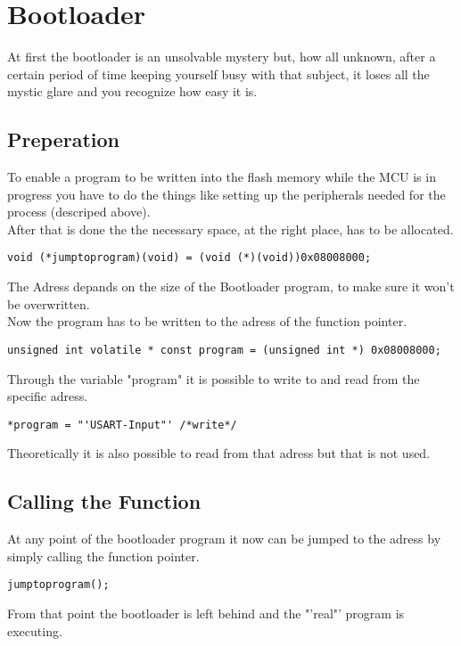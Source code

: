 \chapter{Bootloader}
At first the bootloader is an unsolvable mystery but, how all unknown, after a
certain period of time keeping yourself busy with that subject, it loses all the
mystic glare and you recognize how easy it is.\\

\section{Preperation}
To enable a program to be written into the flash memory while the MCU is in
progress you have to do the things like setting up the peripherals needed for 
the process (descriped above).\\
After that is done the the necessary space, at the right place, has to be
allocated.

\begin{lstlisting}
void (*jumptoprogram)(void) = (void (*)(void))0x08008000;
\end{lstlisting}
The Adress depands on the size of the Bootloader program, to make sure it won't
be overwritten.\\
Now the program has to be written to the adress of the function pointer.
\begin{lstlisting}
unsigned int volatile * const program = (unsigned int *) 0x08008000;
\end{lstlisting}
Through the variable "program" it is possible to write to and read from
the specific adress.
\begin{lstlisting}
*program = "'USART-Input"' /*write*/
\end{lstlisting}
Theoretically it is also possible to read from that adress but that is not
used.
\section{Calling the Function}
At any point of the bootloader program it now can be jumped to the adress
 by simply calling the function pointer.
\begin{lstlisting}
jumptoprogram();
\end{lstlisting}

From that point the bootloader is left behind and the "'real"' program is 
executing.
